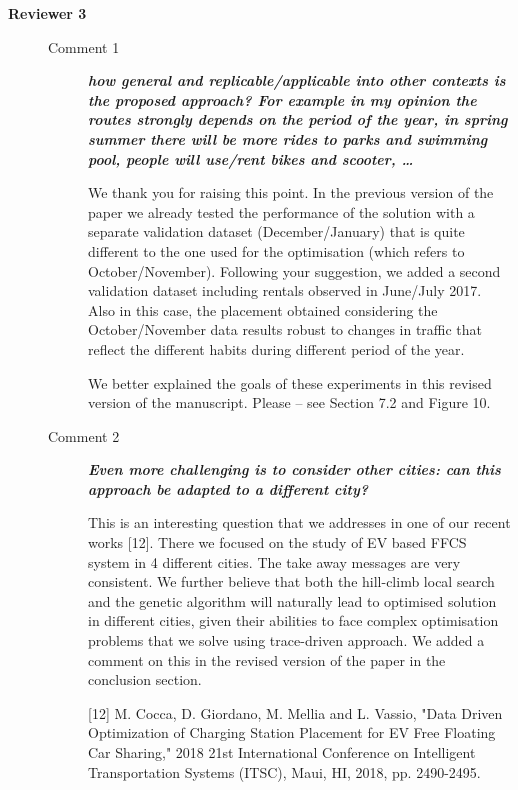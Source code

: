 \documentclass[letterpaper, 10pt]{elsarticle}
\newcommand{\rev}[1]{\textbf{\textit{#1}}}
\begin{document}
\begin{description}
\begin{description}


\end{description}

\vspace{1cm}


 \item[\textbf{Reviewer 3}] \hfill
\begin{description}
 \item[Comment 1] \rev{how general and replicable/applicable into other contexts is the proposed approach? For example in my opinion the routes strongly depends on the period of the year, in spring summer there will be more rides to parks and swimming pool, people will use/rent bikes and scooter, …}

We thank you for raising this point. In the previous version of the paper we already tested the performance of the solution with a separate validation dataset (December/January) that is quite different to the one used for the optimisation (which refers to October/November). Following your suggestion, we added a second validation dataset including rentals observed in June/July 2017. Also in this case, the placement obtained considering the October/November data results robust to changes in traffic that reflect the different habits during different period of the year.

We better explained the goals of these experiments in this revised version of the manuscript. Please -- see Section 7.2 and Figure 10.

\item[Comment 2] \rev{Even more challenging is to consider other cities: can this approach be adapted to a different city?}

This is an interesting question that we addresses in one of our recent works [12]. There we focused on the study of EV based FFCS system in 4 different cities. 
The take away messages are very consistent.
We further believe that both the hill-climb local search and the genetic algorithm will naturally lead to optimised solution in different cities, given their abilities to face complex optimisation problems that we solve using trace-driven approach. We added a comment on this in the revised version of the paper in the conclusion section.


[12] M. Cocca, D. Giordano, M. Mellia and L. Vassio, "Data Driven Optimization of Charging Station Placement for EV Free Floating Car Sharing," 2018 21st International Conference on Intelligent Transportation Systems (ITSC), Maui, HI, 2018, pp. 2490-2495.




\end{description}
\end{description}
\end{document}
